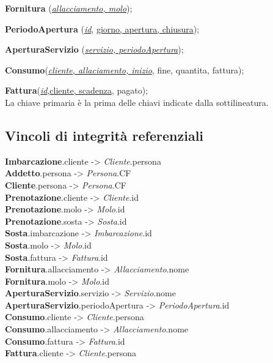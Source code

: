 \textbf{Fornitura} (\underline{\textit{allacciamento, molo}});

\textbf{PeriodoApertura} (\underline{\textit{id}}, \underline{giorno, apertura, chiusura});

\textbf{AperturaServizio} (\underline{\textit{servizio, periodoApertura}});

\textbf{Consumo}(\underline{\textit{cliente, allaciamento, inizio}}, fine, quantita, fattura);

\textbf{Fattura}(\underline{\textit{id}},\underline{cliente, scadenza}, pagato);\\

La chiave primaria è la prima delle chiavi indicate dalla sottilineatura.

\subsection{Vincoli di integrità referenziali}

\textbf{Imbarcazione}.cliente -> \textit{Cliente}.persona\\
\textbf{Addetto}.persona -> \textit{Persona}.CF\\
\textbf{Cliente}.persona -> \textit{Persona}.CF\\
\textbf{Prenotazione}.cliente -> \textit{Cliente}.id\\
\textbf{Prenotazione}.molo -> \textit{Molo}.id\\
\textbf{Prenotazione}.sosta -> \textit{Sosta}.id\\
\textbf{Sosta}.imbarcazione -> \textit{Imbarcazione}.id\\
\textbf{Sosta}.molo -> \textit{Molo}.id\\
\textbf{Sosta}.fattura -> \textit{Fattura}.id\\
\textbf{Fornitura}.allacciamento -> \textit{Allacciamento}.nome\\
\textbf{Fornitura}.molo -> \textit{Molo}.id\\
\textbf{AperturaServizio}.servizio -> \textit{Servizio}.nome\\
\textbf{AperturaServizio}.periodoApertura -> \textit{PeriodoApertura}.id\\
\textbf{Consumo}.cliente -> \textit{Cliente}.persona\\
\textbf{Consumo}.allacciamento -> \textit{Allacciamento}.nome\\
\textbf{Consumo}.fattura -> \textit{Fattura}.id\\
\textbf{Fattura}.cliente -> \textit{Cliente}.persona\\

